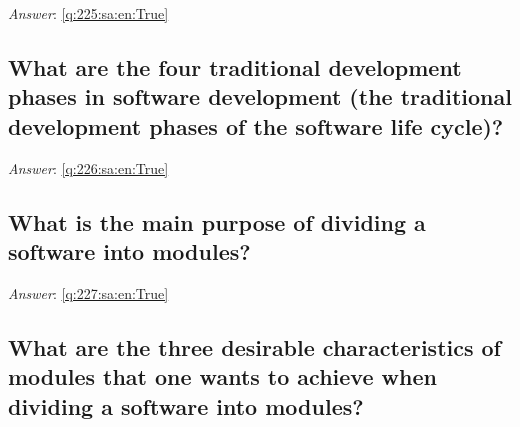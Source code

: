 \documentclass[a4paper,11pt,oneside]{article}
\begin{document}
\begin{sloppypar}
\label{q:225:sa:en:False}

\vspace{2cm}

\noindent\makebox[\textwidth]{\hrulefill}

\vspace{1cm}

\textit{Answer}: \autoref{q:225:sa:en:True}



\subsection{What are the four traditional development phases in software development (the traditional development phases of the software life cycle)?}

\label{q:226:sa:en:False}

\vspace{2cm}

\noindent\makebox[\textwidth]{\hrulefill}

\vspace{1cm}

\textit{Answer}: \autoref{q:226:sa:en:True}



\subsection{What is the main purpose of dividing a software into modules?}

\label{q:227:sa:en:False}

\vspace{2cm}

\noindent\makebox[\textwidth]{\hrulefill}

\vspace{1cm}

\textit{Answer}: \autoref{q:227:sa:en:True}



\subsection{What are the three desirable characteristics of modules that one wants to achieve when dividing a software into modules?}

\label{q:228:sa:en:False}

\vspace{2cm}

\noindent\makebox[\textwidth]{\hrulefill}


\end{sloppypar}
\end{document}
